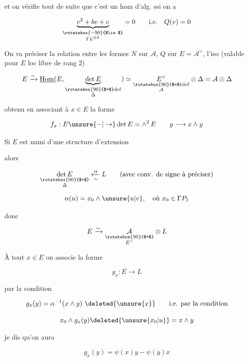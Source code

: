 

et on vérifie tout de suite que c'est un hom d'alg. ssi on a

\[ \underbrace{v^2+bv+c}_{\substack{\rotatebox{-90}{$\in$}\\\Gamma L^{\otimes2}}}=0\qquad\text{i.e.}\quad Q(v)=0 \]

On va préciser la relation entre les formes $N$ sur $\mathcal A$, $Q$ sur $E=\mathcal A^\vee$,   l'iso (valable pour  $E$ loc libre de rang 2)

\[ E\xrightarrow{\sim}\underline{\operatorname{Hom}}(E,\underbrace{\det E}_{\substack{\rotatebox{90}{$=$}\mathrm{def}\\\Delta}})\simeq\underset{\substack{\rotatebox{90}{$=$}\mathrm{def}\\\mathcal A}}{E^\vee}\otimes\Delta=\mathcal A\otimes\Delta \]

obtenu en associant à $x\in E$ la forme

\[ f_x:E\unsure{-|\to}\det E=\mathop{\wedge}\nolimits^2 E\qquad y\longrightarrow x\wedge y \]

Si $E$ est muni d'une structure d'extension


alors

\[ \underset{\substack{\rotatebox{90}{$=$}\\\Delta}}{\det E}\xleftarrow[\sim]{\alpha}L\qquad\text{(avec conv. de signe à préciser)} \]

\[ \alpha(u)=x_0\wedge\unsure{u|v},\quad\text{où }x_0\in\Gamma P_1 \]


donc

\[ E\xrightarrow{\sim}\underset{\substack{\rotatebox{90}{$=$}\\E^\vee}}{\mathcal A}\otimes L \]

À tout $x\in E$ on associe la forme

\[ g_x:E\longrightarrow L \]

 par la condition

\[ g_x(y)=\alpha^{-1}(x\wedge y)\ \deleted{\unsure{x}} \qquad\text{i.e. par la condition} \]

\[ x_0\wedge g_x(y)\deleted{\unsure{x_0|u}}=x\wedge y \]

 je dis qu'on aura 

\[ g_x(y)=\psi(x)y-\psi(y)x \]
